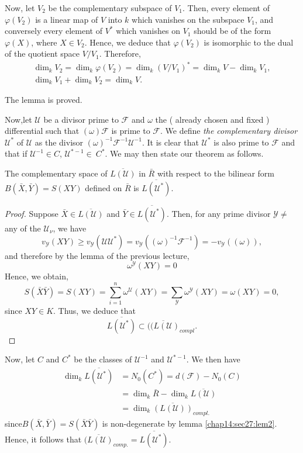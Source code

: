 Now, let $ V_2 $ be the complementary subspace of $ V_1 $. Then, every
element of  $ \varphi (V_2) $ is  a linear map of $ V $ into $k$ which
vanishes on the subspace $V_1 $, and  conversely every element of $V^*$
which vanishes on $ V_1 $ should be of the form $ \varphi (X) $, where
$ X \in V_2 $. Hence, we deduce that $ \varphi (V_2 ) $ is isomorphic
to the dual of the quotient space $ V / V_1 $. Therefore, 
\begin{gather*}
  \dim_k V_2 = \dim_k \varphi  (V_2) = \dim_k ( V/V_{1} )^*  = \dim_k V
  - \dim_k V_1 ,\\ 
  \dim_k V_1 + \dim_k V_2 = \dim_k V.
\end{gather*}

The lemma is proved.

Now,\pageoriginale let $\mathscr{U}$ be a divisor prime to $ \mathcal{F} $ and $
\omega $ the ( already chosen and fixed ) differential such that $
(\omega) \mathcal{F} $ is prime to $ \mathcal{F} $. We define \textit{
  the complementary divisor} $ \mathscr{U}^* $ of $\mathscr{U}$ as the
divisor $ (\omega)^{-1} \mathcal{F}^{-1} \mathscr{U}^{-1} $. It is
clear that $ \mathscr{U}^* $ is also prime to $ \mathcal{F} $  and
that if $ \mathscr{U}^{-1} \in C $, $ \mathscr{U}^{* -1} \in ~ C^*
$. We may then state our theorem as follows. 

\begin{theorem*}
  The complementary space of $ \overline{L (\mathscr{U})} $ in $
  \bar{R} $ with respect to the  bilinear form $ B ( \bar{X}, \bar{Y}
  ) = S (XY) $ defined on $ \bar{R} $ is $ \overline{L(\mathscr{U}^*)}
  $.  
\end{theorem*}

\begin{proof}
  Suppose $ \bar{X} \in  \overline{L (\mathscr{U})} $ and $ \bar{Y}
  \in \overline{L (\mathscr{U}^* )} $. Then, for any prime divisor $
  \mathscr{Y} \neq $ any of the  $ \mathscr{U}_\nu $, we have  
  $$
  v_\mathscr{Y} (XY) \ge v_\mathscr{Y} ( \mathscr{U} \mathscr{U}^* ) =
  v_\mathscr{Y} (( \omega) ^{-1} \mathcal{F}^{-1} ) = - v_\mathscr{Y}
  (( \omega)), 
  $$
  and therefore by the lemma of the previous lecture,
  $$
  \omega^\mathscr{Y} ( XY )= 0 
  $$
  Hence, we obtain, 
  $$
  S ( \bar{X} \bar{Y} ) = S ( X Y ) = \sum^{n}_{i=1}
  \omega^{\mathscr{U}} (XY) = \sum_{\mathscr{Y}} \omega^\mathscr{Y}
  (XY) = \omega (XY) = 0, 
  $$
  since $ XY \in K $. Thus, we deduce that 
  $$
  \overline{L(\mathscr{U}^*)} \subset \overline{(( L (\mathscr{U})}_{compl}. 
  $$
\end{proof}

Now, let $C$ and $C^*$ be the classes of $ \mathscr{U}^{-1} $ and $
\mathscr{U}^{* -1} $. We then have 
\begin{align*}
  \dim_k \overline{L( \mathscr{U}^* )} &= N_0 (C^* ) = d ( \mathcal{F}
  ) - N_0 (C) \\ 
  &= \dim_k \bar{R} - \dim_k  \overline{L ( \mathscr{U} )} \\
  &= \dim_k \overline{( L (\mathscr{U} ))}_{compl.}
\end{align*}
since\pageoriginale $ B ( \bar{X}, \bar{Y} ) = S ( \bar{X} \bar{Y} )$ is
non-degenerate by lemma \ref{chap14:sec27:lem2}. Hence, it follows that $ \overline{( L
  (\mathscr{U})}_{comp.}  = \overline{L (\mathscr{U}^*)} $. 
